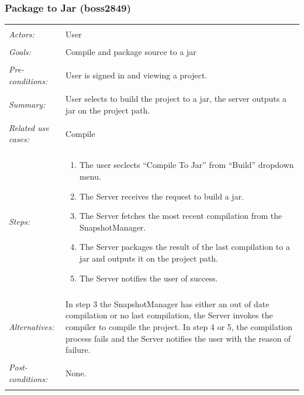 \documentclass[11pt]{article}
\begin{document}
\subsubsection{Package to Jar (boss2849)}
\begin{tabular}{ p{2cm} p{12cm} }
 \hline
 \\
 \textit{Actors:} & User \\ 
 \\
 \textit{Goals:} & Compile and package source to a jar\\
 \\
 \textit{Pre-conditions:} & User is signed in and viewing a project. \\
 \\
 \textit{Summary:} & User selects to build the project to a jar, the server outputs a jar on the project path. \\
 \\
 \textit{Related use cases:} & Compile \\ 
 \\
 \textit{Steps:} & \begin{enumerate}
  \item The user seclects ``Compile To Jar'' from ``Build'' dropdown menu.
  \item The Server receives the request to build a jar.
  \item The Server fetches the most recent compilation from the SnapshotManager.
  \item The Server packages the result of the last compilation to a jar and outputs it on the project path.
  \item The Server notifies the user of success.
 \end{enumerate} \\
 \\
 \textit{Alternatives:} & In step 3 the SnapshotManager has either an out of date compilation or no last compilation, the Server invokes the compiler to compile the project. In step 4 or 5, the compilation process fails and the Server notifies the user with the reason of failure. \\
 \\
 \textit{Post-conditions:} & None. \\
 \\
\hline
\end{tabular}
\end{document}
